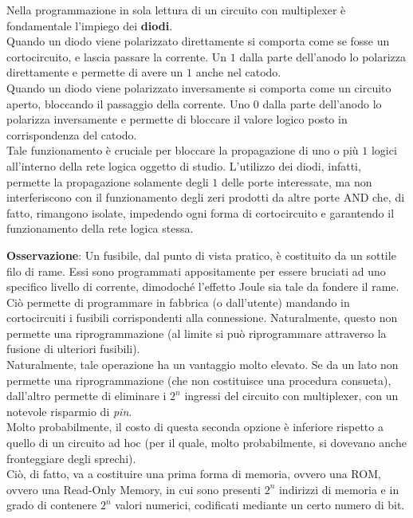 \documentclass[a4paper]{extarticle}
\begin{document}
\vspace{1em}
\noindent
Nella programmazione in sola lettura di un circuito con multiplexer è fondamentale l'impiego dei \textbf{diodi}.\\
Quando un diodo viene polarizzato direttamente si comporta come se fosse un cortocircuito, e lascia passare la corrente. Un \(1\) dalla parte dell'anodo lo polarizza direttamente e permette di avere un \(1\) anche nel catodo.\\
Quando un diodo viene polarizzato inversamente si comporta come un circuito aperto, bloccando il passaggio della corrente. Uno \(0\) dalla parte dell'anodo lo polarizza inversamente e permette di bloccare il valore logico posto in corrispondenza del catodo.\\
Tale funzionamento è cruciale per bloccare la propagazione di uno o più \(1\) logici all'interno della rete logica oggetto di studio. L'utilizzo dei diodi, infatti, permette la propagazione solamente degli \(1\) delle porte interessate, ma non interferiscono con il funzionamento degli zeri prodotti da altre porte AND che, di fatto, rimangono isolate, impedendo ogni forma di cortocircuito e garantendo il funzionamento della rete logica stessa.

\vspace{1em}
\noindent
\textbf{Osservazione}: Un fusibile, dal punto di vista pratico, è costituito da un sottile filo di rame. Essi sono programmati appositamente per essere bruciati ad uno specifico livello di corrente, dimodoché l'effetto Joule sia tale da fondere il rame.\\
Ciò permette di programmare in fabbrica (o dall'utente) mandando in cortocircuiti i fusibili corrispondenti alla connessione. Naturalmente, questo non permette una riprogrammazione (al limite si può riprogrammare attraverso la fusione di ulteriori fusibili).\\

\vspace{1em}
\noindent
Naturalmente, tale operazione ha un vantaggio molto elevato. Se da un lato non permette una riprogrammazione (che non costituisce una procedura consueta), dall'altro permette di eliminare i \(2^n\) ingressi del circuito con multiplexer, con un notevole risparmio di \textit{pin}.\\
Molto probabilmente, il costo di questa seconda opzione è inferiore rispetto a quello di un circuito ad hoc (per il quale, molto probabilmente, si dovevano anche fronteggiare degli sprechi).\\
Ciò, di fatto, va a costituire una prima forma di memoria, ovvero una ROM, ovvero una Read-Only Memory, in cui sono presenti \(2^n\) indirizzi di memoria e in grado di contenere \(2^n\) valori numerici, codificati mediante un certo numero di bit.
\end{document}
